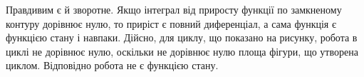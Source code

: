 Правдивим є й зворотне. Якщо інтеграл від приросту функції по замкненому контуру дорівнює нулю, то приріст є повний диференціал, а сама функція є функцією стану і навпаки. Дійсно, для циклу, що показано на рисунку, робота в циклі не дорівнює нулю, оскільки не дорівнює нулю площа фігури, що утворена циклом. Відповідно робота не є функцією стану.
